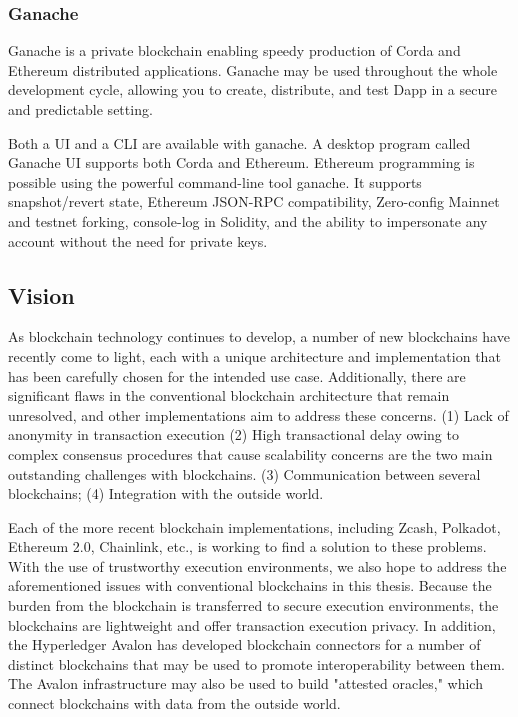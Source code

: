 \subsubsection{Ganache}

Ganache is a private blockchain enabling speedy production of Corda and Ethereum distributed applications. Ganache may be used throughout the whole development cycle, allowing you to create, distribute, and test \ac{Dapp} in a secure and predictable setting.

\vspace{.5cm}

Both a \ac{UI} and a \ac{CLI} are available with ganache. A desktop program called Ganache \ac{UI} supports both Corda and Ethereum. Ethereum programming is possible using the powerful command-line tool ganache. It supports snapshot/revert state, Ethereum JSON-RPC compatibility, Zero-config Mainnet and testnet forking, console-log in Solidity, and the ability to impersonate any account without the need for private keys.

\subsection{Vision}
As blockchain technology continues to develop, a number of new blockchains have recently come to light, each with a unique architecture and implementation that has been carefully chosen for the intended use case. Additionally, there are significant flaws in the conventional blockchain architecture that remain unresolved, and other implementations aim to address these concerns. (1) Lack of anonymity in transaction execution (2) High transactional delay owing to complex consensus procedures that cause scalability concerns are the two main outstanding challenges with blockchains. (3) Communication between several blockchains; (4) Integration with the outside world.

\vspace{.5cm}

Each of the more recent blockchain implementations, including Zcash, Polkadot, Ethereum 2.0, Chainlink, etc., is working to find a solution to these problems. With the use of trustworthy execution environments, we also hope to address the aforementioned issues with conventional blockchains in this thesis. Because the burden from the blockchain is transferred to secure execution environments, the blockchains are lightweight and offer transaction execution privacy. In addition, the Hyperledger Avalon has developed blockchain connectors for a number of distinct blockchains that may be used to promote interoperability between them. The Avalon infrastructure may also be used to build "attested oracles," which connect blockchains with data from the outside world.
